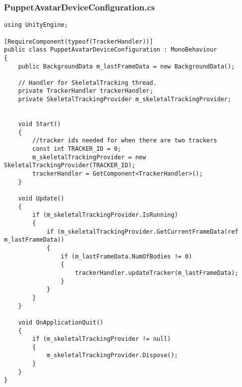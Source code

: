 \subsubsection*{PuppetAvatarDeviceConfiguration.cs}
\begin{verbatim}
﻿using UnityEngine;

[RequireComponent(typeof(TrackerHandler))]
public class PuppetAvatarDeviceConfiguration : MonoBehaviour
{
    public BackgroundData m_lastFrameData = new BackgroundData();

    // Handler for SkeletalTracking thread.
    private TrackerHandler trackerHandler;
    private SkeletalTrackingProvider m_skeletalTrackingProvider;


    void Start()
    {
        //tracker ids needed for when there are two trackers
        const int TRACKER_ID = 0;
        m_skeletalTrackingProvider = new SkeletalTrackingProvider(TRACKER_ID);
        trackerHandler = GetComponent<TrackerHandler>();
    }

    void Update()
    {
        if (m_skeletalTrackingProvider.IsRunning)
        {
            if (m_skeletalTrackingProvider.GetCurrentFrameData(ref m_lastFrameData))
            {
                if (m_lastFrameData.NumOfBodies != 0)
                {
                    trackerHandler.updateTracker(m_lastFrameData);
                }
            }
        }
    }

    void OnApplicationQuit()
    {
        if (m_skeletalTrackingProvider != null)
        {
            m_skeletalTrackingProvider.Dispose();
        }
    }
}
\end{verbatim}
